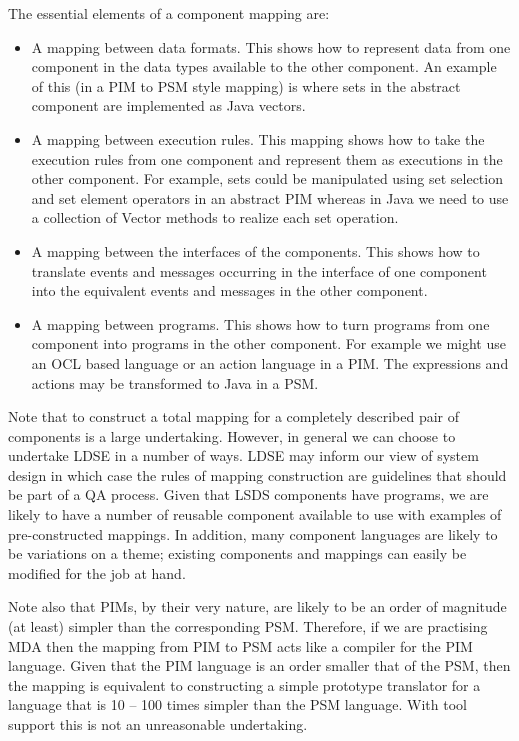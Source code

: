 \documentclass{article}
\begin{document}
The essential elements of a component mapping are:

\begin{itemize}

\item A mapping between data formats. This shows how to represent data from one component 
in the data types available to the other component. An example of this (in a PIM to
PSM style mapping) is where sets in the abstract component are implemented as Java vectors.

\item A mapping between execution rules. This mapping shows how to take the execution rules
from one component and represent them as executions in the other component. For example,
sets could be manipulated using set selection and set element operators in an abstract
PIM whereas in Java we need to use a collection of Vector methods to realize each set
operation.

\item A mapping between the interfaces of the components. This shows how to translate 
events and messages occurring in the interface of one component into the equivalent events
and messages in the other component.

\item A mapping between programs. This shows how to turn programs from one component
into programs in the other component. For example we might use an OCL based language
or an action language in a PIM. The expressions and actions may be transformed to Java in
a PSM.

\end{itemize}
Note that to construct a total mapping for a completely described pair of components is
a large undertaking. However, in general we can choose to undertake LDSE in a number of ways.
LDSE may inform our view of system design in which case the rules of mapping construction are 
guidelines that should be part of a QA process. Given that LSDS components have programs,
we are likely to have a number of reusable component available to use with examples of
pre-constructed mappings. In addition, many component languages are likely to be variations
on a theme; existing components and mappings can easily be modified for the job at hand.

Note also that PIMs, by their very nature, are likely to be an order of magnitude (at least)
simpler than the corresponding PSM. Therefore, if we are practising MDA then the mapping
from PIM to PSM acts like a compiler for the PIM language. Given that the PIM language
is an order smaller that of the PSM, then the mapping is equivalent to constructing a
simple prototype translator for a language that is 10 -- 100 times simpler than the PSM
language. With tool support this is not an unreasonable undertaking.
\end{document}
